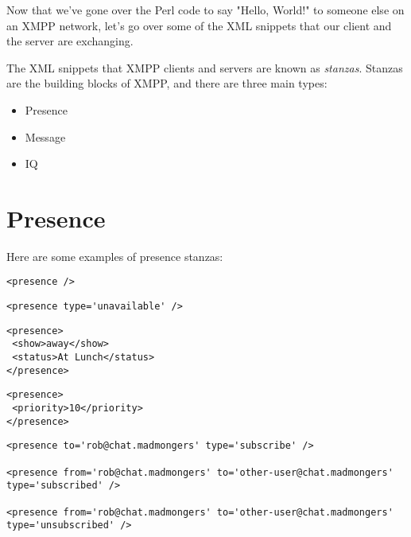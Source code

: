 Now that we've gone over the Perl code to say "Hello, World!" to someone else on an XMPP
network, let's go over some of the XML snippets that our client and the server are exchanging.
\pause

The XML snippets that XMPP clients and servers are known as \textit{stanzas}.  Stanzas are the
building blocks of XMPP, and there are three main types:
\pause

\begin{itemize}
\item Presence
\pause
\item Message
\pause
\item IQ
\end{itemize}

\newpage
\section{Presence}

\pause
Here are some examples of presence stanzas:

\begin{shaded}
\begin{verbatim}
<presence />
\end{verbatim}
\end{shaded}

\pause
\begin{shaded}
\begin{verbatim}
<presence type='unavailable' />
\end{verbatim}
\end{shaded}

\pause
\begin{shaded}
\begin{verbatim}
<presence>
 <show>away</show>
 <status>At Lunch</status>
</presence>
\end{verbatim}
\end{shaded}

\pause
\begin{shaded}
\begin{verbatim}
<presence>
 <priority>10</priority>
</presence>
\end{verbatim}
\end{shaded}

\pause
\begin{shaded}
\begin{verbatim}
<presence to='rob@chat.madmongers' type='subscribe' />

<presence from='rob@chat.madmongers' to='other-user@chat.madmongers' type='subscribed' />

<presence from='rob@chat.madmongers' to='other-user@chat.madmongers' type='unsubscribed' />
\end{verbatim}
\end{shaded}

